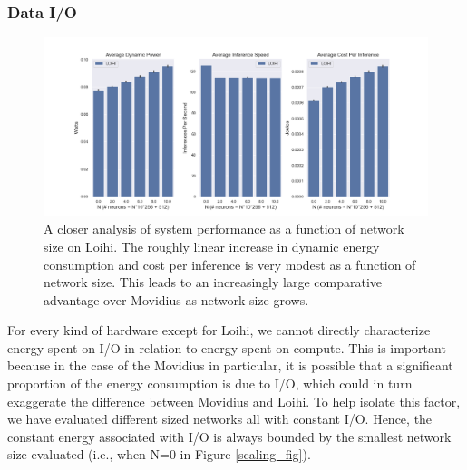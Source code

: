 \documentclass{article}
\begin{document}

\subsubsection{Data I/O}


\begin{figure}[ht!]
\centering
    \includegraphics[width=6.7in]{./figures/loihi_summary.png}
    \caption{A closer analysis of system performance as a function of network size on Loihi. The roughly linear increase in dynamic energy consumption and cost per inference is very modest as a function of network size. This leads to an increasingly large comparative advantage over Movidius as network size grows.}
\label{loihi_fig}
\end{figure}

For every kind of hardware except for Loihi, we cannot directly characterize energy spent on I/O in relation to energy spent on compute. This is important because in the case of the Movidius in particular, it is possible that a significant proportion of the energy consumption is due to I/O, which could in turn exaggerate the difference between Movidius and Loihi. To help isolate this factor, we have evaluated different sized networks all with constant I/O. Hence, the constant energy associated with I/O is always bounded by the smallest network size evaluated (i.e., when N=0 in Figure \ref{scaling_fig}).
\end{document}
